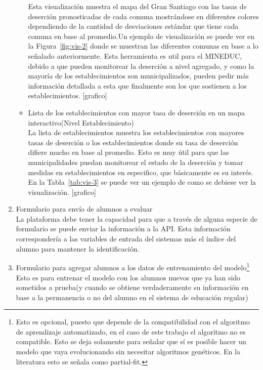 \begin{enumerate}
\begin{itemize}
    Esta visualización muestra el mapa del Gran Santiago con las tasas de deserción pronosticadas de cada comuna mostrándose en diferentes colores dependiendo de la cantidad de desviaciones estándar que tiene cada comuna en base al promedio.Un ejemplo de visualización se puede ver en la Figura~\ref{fig:vis-2} donde se muestran las diferentes comunas en base a lo señalado anteriormente. Esta herramienta es util para el MINEDUC, debido a que pueden monitorear la deserción a nivel agregado, y como la mayoría de los establecimientos son municipalizados, pueden pedir más información detallada a esta que finalmente son los que sostienen a los establecimientos.
    [grafico]
    \item Lista de los establecimientos con mayor tasa de deserción en un mapa interactivo(Nivel Establecimiento) \\ \hfill
    La lista de establecimientos muestra los establecimientos con mayores tasas de deserción o los establecimientos donde su tasa de deserción difiere mucho en base al promedio. Esto es muy útil para que las municipalidades puedan monitorear el estado de la deserción y tomar medidas en establecimientos en especifico, que básicamente es su interés. En la Tabla~\ref{tab:vis-3} se puede ver un ejemplo de como se debiese ver la visualización.
    [grafico]
    \end{itemize}
\item Formulario para envío de alumnos a evaluar \\ \hfill
La plataforma debe tener la capacidad para que a través de alguna especie de formulario se puede enviar la información a la API. Esta información correspondería a las variables de entrada del sistemas más el índice del alumno para mantener la identificación.
\item Formulario para agregar alumnos a los datos de entrenamiento del modelo\footnote{Esto es opcional, puesto que depende de la compatibilidad con el algoritmo de aprendizaje automatizado, en el caso de este trabajo el algoritmo no es compatible. Esto se deja solamente para señalar que sí es posible hacer un modelo que vaya evolucionando sin necesitar algoritmos genéticos. En la literatura esto se señala como partial-fit.} \\ \hfill
Esto es para entrenar el modelo con los alumnos nuevos que ya han sido sometidos a prueba(y cuando se obtiene verdaderamente su información en base a la permanencia o no del alumno en el sistema de educación regular)
\end{enumerate}

